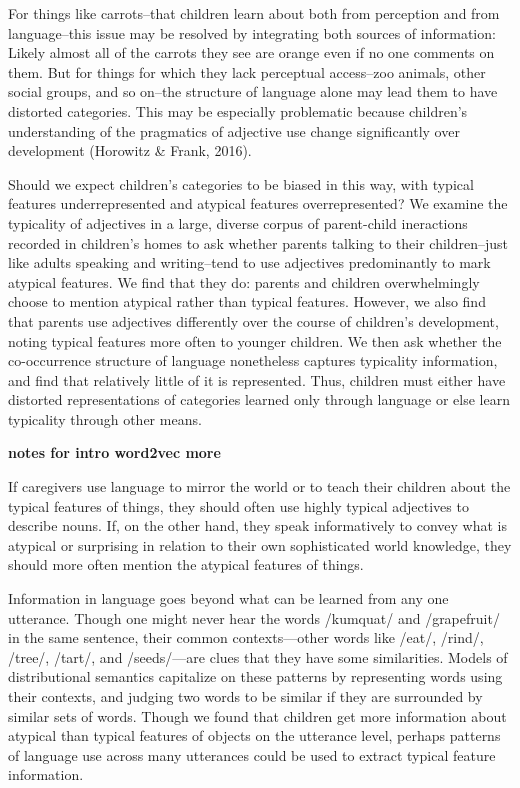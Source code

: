 \documentclass[10pt, letterpaper]{article}
\begin{document}
For things like carrots--that children learn about both from perception
and from language--this issue may be resolved by integrating both
sources of information: Likely almost all of the carrots they see are
orange even if no one comments on them. But for things for which they
lack perceptual access--zoo animals, other social groups, and so on--the
structure of language alone may lead them to have distorted categories.
This may be especially problematic because children's understanding of
the pragmatics of adjective use change significantly over development
(Horowitz \& Frank, 2016).

Should we expect children's categories to be biased in this way, with
typical features underrepresented and atypical features overrepresented?
We examine the typicality of adjectives in a large, diverse corpus of
parent-child ineractions recorded in children's homes to ask whether
parents talking to their children--just like adults speaking and
writing--tend to use adjectives predominantly to mark atypical features.
We find that they do: parents and children overwhelmingly choose to
mention atypical rather than typical features. However, we also find
that parents use adjectives differently over the course of children's
development, noting typical features more often to younger children. We
then ask whether the co-occurrence structure of language nonetheless
captures typicality information, and find that relatively little of it
is represented. Thus, children must either have distorted
representations of categories learned only through language or else
learn typicality through other means.

\textbf{notes for intro word2vec more}

If caregivers use language to mirror the world or to teach their
children about the typical features of things, they should often use
highly typical adjectives to describe nouns. If, on the other hand, they
speak informatively to convey what is atypical or surprising in relation
to their own sophisticated world knowledge, they should more often
mention the atypical features of things.

Information in language goes beyond what can be learned from any one
utterance. Though one might never hear the words /kumquat/ and
/grapefruit/ in the same sentence, their common contexts---other words
like /eat/, /rind/, /tree/, /tart/, and /seeds/---are clues that they
have some similarities. Models of distributional semantics capitalize on
these patterns by representing words using their contexts, and judging
two words to be similar if they are surrounded by similar sets of words.
Though we found that children get more information about atypical than
typical features of objects on the utterance level, perhaps patterns of
language use across many utterances could be used to extract typical
feature information.
\end{document}
